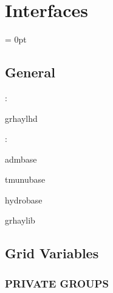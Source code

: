
\section{Interfaces} 


\parskip = 0pt

\vspace{3mm} \subsection*{General}

: 

grhaylhd
\vspace{2mm}

: 

admbase

tmunubase

hydrobase

grhaylib
\vspace{2mm}
\subsection*{Grid Variables}
\vspace{5mm}\subsubsection{PRIVATE GROUPS}

\vspace{5mm}

